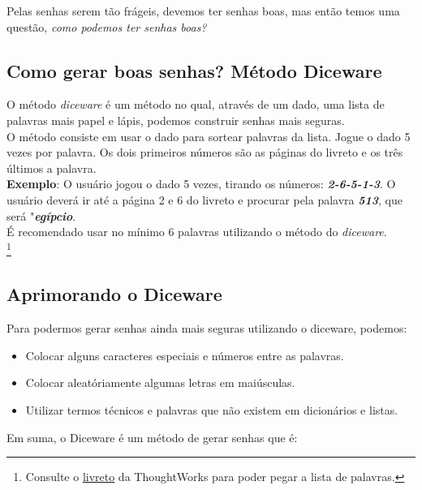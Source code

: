 \documentclass[12pt, letterpaper]{report}
\begin{document}
	Pelas senhas serem tão frágeis, devemos ter senhas boas, mas então temos uma questão, \textit{como podemos ter senhas boas?}\\

\subsection{Como gerar boas senhas? Método Diceware}

	O método \textit{diceware} é um método no qual, através de um dado, uma lista de palavras mais papel e lápis, podemos construir senhas mais seguras.\\

	O método consiste em usar o dado para sortear palavras da lista. Jogue o dado 5 vezes por palavra. Os dois primeiros números são as páginas do livreto e os três últimos a palavra.\\

	\textbf{Exemplo}: O usuário jogou o dado 5 vezes, tirando os números: \textbf{\textit{2-6-5-1-3}}. O usuário deverá ir até a página 2 e 6 do livreto e procurar pela palavra \textbf{\textit{513}}, que será "\textbf{\textit{egípcio}}.\\

	É recomendado usar no mínimo 6 palavras utilizando o método do \textit{diceware}.\\


	\footnote{Consulte o \href{https://github.com/thoughtworks/dadoware}{livreto} da ThoughtWorks para poder pegar a lista de palavras.}


\subsection{Aprimorando o Diceware}

	Para podermos gerar senhas ainda mais seguras utilizando o diceware, podemos:

\begin{itemize}
	\item Colocar alguns caracteres especiais e números entre as palavras.
	\item Colocar aleatóriamente algumas letras em maiúsculas.
	\item Utilizar termos técnicos e palavras que não existem em dicionários e listas.\\
\end{itemize}

	Em suma, o Diceware é um método de gerar senhas que é:
\end{document}
